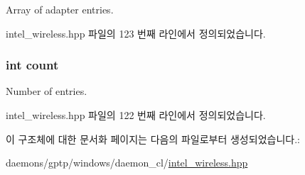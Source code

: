 Array of adapter entries. 



intel\+\_\+wireless.\+hpp 파일의 123 번째 라인에서 정의되었습니다.

\subsubsection[{\texorpdfstring{count}{count}}]{\setlength{\rightskip}{0pt plus 5cm}int count}\hypertarget{struct_i_n_t_e_l___a_d_a_p_t_e_r___l_i_s_t_ad43c3812e6d13e0518d9f8b8f463ffcf}{}\label{struct_i_n_t_e_l___a_d_a_p_t_e_r___l_i_s_t_ad43c3812e6d13e0518d9f8b8f463ffcf}


Number of entries. 



intel\+\_\+wireless.\+hpp 파일의 122 번째 라인에서 정의되었습니다.



이 구조체에 대한 문서화 페이지는 다음의 파일로부터 생성되었습니다.\+:\begin{DoxyCompactItemize}
\item 
daemons/gptp/windows/daemon\+\_\+cl/\hyperlink{intel__wireless_8hpp}{intel\+\_\+wireless.\+hpp}\end{DoxyCompactItemize}
